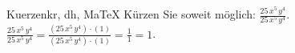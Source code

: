 \begin{MAufgabe}{Kuerzen}{kr, dh, MaTeX}
K\"urzen Sie soweit m\"oglich: $\frac{25\, x^5\, y^4}{25\, x^5\, y^4}$.\\ 
\ifLsg\MLoesung
\quad $\frac{25\, x^5\, y^4}{25\, x^5\, y^4}=\frac{(25\, x^5\, y^4)\cdot(1)}{(25\, x^5\, y^4)\cdot(1)}=\frac{1}{1}=1$.\else\relax\fi
 \end{MAufgabe}